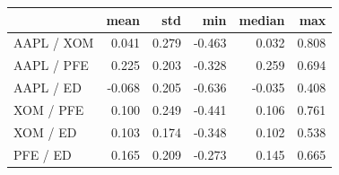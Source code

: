 \begin{tabular}{lrrrrr}
\toprule
 & mean & std & min & median & max \\
\midrule
AAPL / XOM & 0.041 & 0.279 & -0.463 & 0.032 & 0.808 \\
AAPL / PFE & 0.225 & 0.203 & -0.328 & 0.259 & 0.694 \\
AAPL / ED & -0.068 & 0.205 & -0.636 & -0.035 & 0.408 \\
XOM / PFE & 0.100 & 0.249 & -0.441 & 0.106 & 0.761 \\
XOM / ED & 0.103 & 0.174 & -0.348 & 0.102 & 0.538 \\
PFE / ED & 0.165 & 0.209 & -0.273 & 0.145 & 0.665 \\
\bottomrule
\end{tabular}

